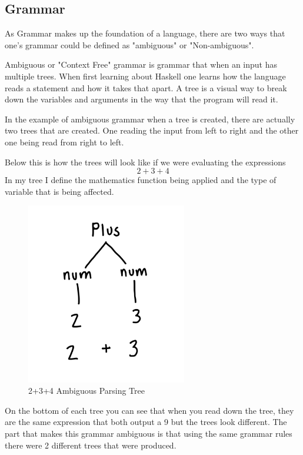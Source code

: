 \documentclass{article}
\begin{document}
\subsection{Grammar}

\medskip\noindent
As Grammar makes up the foundation of a language, there are two ways that one's grammar could be defined as "ambiguous" or "Non-ambiguous". 

\medskip\noindent
Ambiguous or "Context Free" grammar is grammar that when an input has multiple trees. When first learning about Haskell one learns how the language reads a statement and how it takes that apart. A tree is a visual way to break down the variables and arguments in the way that the program will read it. 

\medskip\noindent
In the example of ambiguous grammar when a tree is created, there are actually two trees that are created. One reading the input from left to right and the other one being read from right to left. 

\medskip\noindent
Below this is how the trees will look like if we were evaluating the expressions $$2+3+4$$ In my tree I define the mathematics function being applied and the type of variable that is being affected. 

\medskip\noindent 
\begin{figure}[htp]
    \centering
    \includegraphics[width=7cm]{2+3tree.jpg}
    \caption{2+3+4 Ambiguous Parsing Tree}
    \label{fig:Parsing Tree 1}
\end{figure}

\medskip\noindent
On the bottom of each tree you can see that when you read down the tree, they are the same expression that both output a 9 but the trees look different. The part that makes this grammar ambiguous is that using the same grammar rules there were 2 different trees that were produced. 
\end{document}
